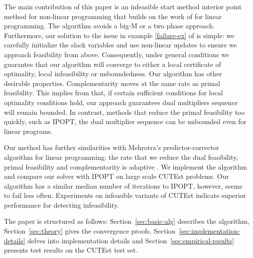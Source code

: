 \documentclass{article}
\begin{document}
The main contribution of this paper is an infeasible start method interior point method for non-linear programming that builds on the work of \cite{lustig1990feasibility, mehrotra1992implementation} for linear programming. The algorithm avoids a big-M or a two phase approach. Furthermore, our solution to the issue in example \eqref{failure-ex} of \cite{wachter2000failure} is simple: we carefully initialize the slack variables and use non-linear updates to ensure we approach feasibility from above. Consequently, under general conditions we guarantee that our algorithm will converge to either a local certificate of optimality, local infeasibility or unboundedness. Our algorithm has other desirable properties. Complementarity moves at the same rate as primal feasibility. This implies from \cite{lagIPM} that, if certain sufficient conditions for local optimality conditions hold, our approach guarantees dual multipliers sequence will remain bounded. In contrast, methods that reduce the primal feasibility too quickly, such as IPOPT,  the dual multiplier sequence can be unbounded even for linear programs.



Our method has further similarities with Mehrotra's \cite{mehrotra1992implementation} predictor-corrector algorithm for linear programming: the rate that we reduce the dual feasibility, primal feasibility and complementarity is adaptive . We implement the algorithm and compare our solver with IPOPT on large scale CUTEst problems. Our algorithm has a similar median number of iterations to IPOPT, however, seems to fail less often. Experiments on infeasible variants of CUTEst indicate superior performance for detecting infeasibility.

The paper is structured as follows: Section~\ref{sec:basic-alg} describes the algorithm, Section~\ref{sec:theory} gives the convergence proofs, Section~\ref{sec:implementation-details} delves into implementation details and Section~\ref{sec:empirical-results} presents test results on the CUTEst test set.
\end{document}
